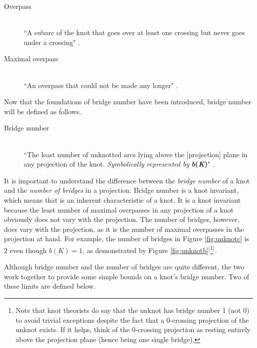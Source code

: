 \documentclass[titlepage,11pt]{article}
\newcommand{\dq}[4][]{``#2"#1 \cite[#4]{#3}.}
\begin{document}
\begin{defi}
    \begin{description}
        \item[Overpass] \hfill \\ \dq{A subarc of the knot that goes over at least one crossing but never goes under a crossing}{bib:knotbook}{64}
        \item[Maximal overpass] \hfill \\ \dq{An overpass that could not be made any longer}{bib:knotbook}{65}
    \end{description}
\end{defi}

Now that the foundations of bridge number have been introduced, bridge number will be defined as follows.

\begin{defi}
    \begin{description}
        \item[Bridge number] \hfill \\ \dq{The least number of unknotted arcs lying above the [projection] plane in any projection of the knot. \emph{Symbolically represented by} \textbf{\emph{b}(\emph{K})}}{bib:knotnotes}{25}
    \end{description}
\end{defi}

It is important to understand the difference between the \emph{bridge number} of a knot and the \emph{number of bridges} in a projection. Bridge number is a knot invariant, which means that is an inherent characteristic of a knot. It is a knot invariant because the least number of maximal overpasses in any projection of a knot obviously does not vary with the projection. The number of bridges, however, does vary with the projection, as it is the number of maximal overpasses in the projection at hand. For example, the number of bridges in Figure \ref{fig:unknotc} is 2 even though $b(K)=1$, as demonstrated by Figure \ref{fig:unknotb}$^[$\footnote{Note that knot theorists do say that the unknot has bridge number 1 (not 0) to avoid trivial exceptions despite the fact that a 0-crossing projection of the unknot exists. If it helps, think of the 0-crossing projection as resting entirely above the projection plane (hence being one single bridge).}$^]$.\par
Although bridge number and the number of bridges are quite different, the two work together to provide some simple bounds on a knot's bridge number. Two of these limits are defined below.
\end{document}
